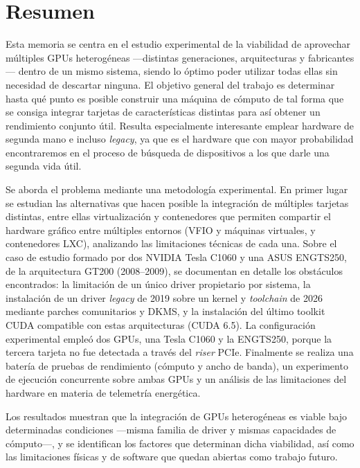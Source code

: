 \section*{Resumen}\label{abstract}

Esta memoria se centra en el estudio experimental de la viabilidad de aprovechar múltiples GPUs heterogéneas ---distintas generaciones, arquitecturas y fabricantes--- dentro de un mismo sistema, siendo lo óptimo poder utilizar todas ellas sin necesidad de descartar ninguna. El objetivo general del trabajo es determinar hasta qué punto es posible construir una máquina de cómputo de tal forma que se consiga integrar tarjetas de características distintas para así obtener un rendimiento conjunto útil. Resulta especialmente interesante emplear hardware de segunda mano e incluso \textit{legacy}, ya que es el hardware que con mayor probabilidad encontraremos en el proceso de búsqueda de dispositivos a los que darle una segunda vida útil.

Se aborda el problema mediante una metodología experimental. En primer lugar se estudian las alternativas que hacen posible la integración de múltiples tarjetas distintas, entre ellas virtualización y contenedores que permiten compartir el hardware gráfico entre múltiples entornos (VFIO y máquinas virtuales, y contenedores LXC), analizando las limitaciones técnicas de cada una. Sobre el caso de estudio formado por dos NVIDIA Tesla C1060 y una ASUS ENGTS250, de la arquitectura GT200 (2008--2009), se documentan en detalle los obstáculos encontrados: la limitación de un único driver propietario por sistema, la instalación de un driver \textit{legacy} de 2019 sobre un kernel y \textit{toolchain} de 2026 mediante parches comunitarios y DKMS, y la instalación del último toolkit CUDA compatible con estas arquitecturas (CUDA 6.5). La configuración experimental empleó dos GPUs, una Tesla C1060 y la ENGTS250, porque la tercera tarjeta no fue detectada a través del \textit{riser} PCIe. Finalmente se realiza una batería de pruebas de rendimiento (cómputo y ancho de banda), un experimento de ejecución concurrente sobre ambas GPUs y un análisis de las limitaciones del hardware en materia de telemetría energética.

Los resultados muestran que la integración de GPUs heterogéneas es viable bajo determinadas condiciones ---misma familia de driver y mismas capacidades de cómputo---, y se identifican los factores que determinan dicha viabilidad, así como las limitaciones físicas y de software que quedan abiertas como trabajo futuro.

